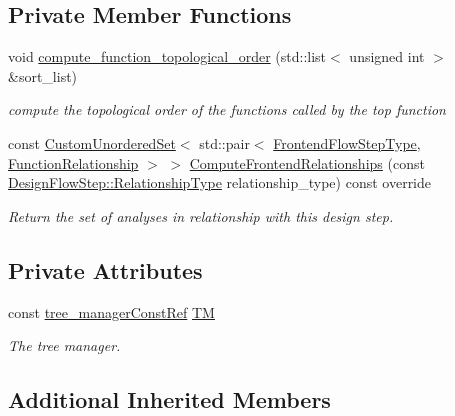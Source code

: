 \subsection*{Private Member Functions}
\begin{DoxyCompactItemize}
\item 
void \hyperlink{classipa__point__to__analysis_af0c17eb410da57bdc9a4e17dca79ef34}{compute\+\_\+function\+\_\+topological\+\_\+order} (std\+::list$<$ unsigned int $>$ \&sort\+\_\+list)
\begin{DoxyCompactList}\small\item\em compute the topological order of the functions called by the top function \end{DoxyCompactList}\item 
const \hyperlink{classCustomUnorderedSet}{Custom\+Unordered\+Set}$<$ std\+::pair$<$ \hyperlink{frontend__flow__step_8hpp_afeb3716c693d2b2e4ed3e6d04c3b63bb}{Frontend\+Flow\+Step\+Type}, \hyperlink{classFrontendFlowStep_af7cf30f2023e5b99e637dc2058289ab0}{Function\+Relationship} $>$ $>$ \hyperlink{classipa__point__to__analysis_a91ec321eddd93d5d46d084d7c37d74b7}{Compute\+Frontend\+Relationships} (const \hyperlink{classDesignFlowStep_a723a3baf19ff2ceb77bc13e099d0b1b7}{Design\+Flow\+Step\+::\+Relationship\+Type} relationship\+\_\+type) const override
\begin{DoxyCompactList}\small\item\em Return the set of analyses in relationship with this design step. \end{DoxyCompactList}\end{DoxyCompactItemize}
\subsection*{Private Attributes}
\begin{DoxyCompactItemize}
\item 
const \hyperlink{tree__manager_8hpp_a792e3f1f892d7d997a8d8a4a12e39346}{tree\+\_\+manager\+Const\+Ref} \hyperlink{classipa__point__to__analysis_a85c5484838931e1ea19b55d79e5e5880}{TM}
\begin{DoxyCompactList}\small\item\em The tree manager. \end{DoxyCompactList}\end{DoxyCompactItemize}
\subsection*{Additional Inherited Members}


